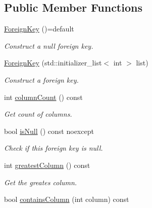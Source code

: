 \subsection*{Public Member Functions}
\begin{DoxyCompactItemize}
\item 
\hyperlink{class_mdt_1_1_item_model_1_1_foreign_key_ab323405845b8a802f6427f7b8385b8a1}{Foreign\+Key} ()=default\hypertarget{class_mdt_1_1_item_model_1_1_foreign_key_ab323405845b8a802f6427f7b8385b8a1}{}\label{class_mdt_1_1_item_model_1_1_foreign_key_ab323405845b8a802f6427f7b8385b8a1}

\begin{DoxyCompactList}\small\item\em Construct a null foreign key. \end{DoxyCompactList}\item 
\hyperlink{class_mdt_1_1_item_model_1_1_foreign_key_af0b8d7d06a4ce82f9d2a249f0a3be48a}{Foreign\+Key} (std\+::initializer\+\_\+list$<$ int $>$ list)
\begin{DoxyCompactList}\small\item\em Construct a foreign key. \end{DoxyCompactList}\item 
int \hyperlink{class_mdt_1_1_item_model_1_1_foreign_key_a80633c40fefe1887ac53935a393ea118}{column\+Count} () const \hypertarget{class_mdt_1_1_item_model_1_1_foreign_key_a80633c40fefe1887ac53935a393ea118}{}\label{class_mdt_1_1_item_model_1_1_foreign_key_a80633c40fefe1887ac53935a393ea118}

\begin{DoxyCompactList}\small\item\em Get count of columns. \end{DoxyCompactList}\item 
bool \hyperlink{class_mdt_1_1_item_model_1_1_foreign_key_ad763e7d1ddddb045b8d3532dcb8100ed}{is\+Null} () const noexcept\hypertarget{class_mdt_1_1_item_model_1_1_foreign_key_ad763e7d1ddddb045b8d3532dcb8100ed}{}\label{class_mdt_1_1_item_model_1_1_foreign_key_ad763e7d1ddddb045b8d3532dcb8100ed}

\begin{DoxyCompactList}\small\item\em Check if this foreign key is null. \end{DoxyCompactList}\item 
int \hyperlink{class_mdt_1_1_item_model_1_1_foreign_key_a44cb8426d8abc3738bfb9f50baeeb592}{greatest\+Column} () const 
\begin{DoxyCompactList}\small\item\em Get the greates column. \end{DoxyCompactList}\item 
bool \hyperlink{class_mdt_1_1_item_model_1_1_foreign_key_a7d0a73a452c74ca6f81adb5f563e78fd}{contains\+Column} (int column) const \hypertarget{class_mdt_1_1_item_model_1_1_foreign_key_a7d0a73a452c74ca6f81adb5f563e78fd}{}\label{class_mdt_1_1_item_model_1_1_foreign_key_a7d0a73a452c74ca6f81adb5f563e78fd}


\end{DoxyCompactItemize}

